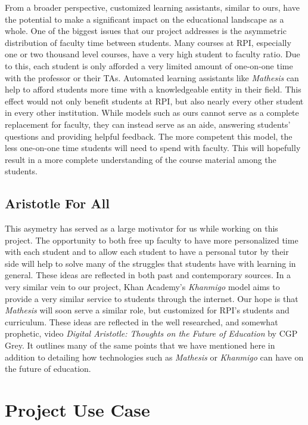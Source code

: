 \documentclass[12pt,a4paper]{article}
\begin{document}
    From a broader perspective, customized learning assistants, similar to ours, have the potential
    to make a significant impact on the educational landscape as a whole.  One of the biggest issues
    that our project addresses is the asymmetric distribution of faculty time between students.
    Many courses at RPI, especially one or two thousand level courses, have a very high student to
    faculty ratio.  Due to this, each student is only afforded a very limited amount of one-on-one
    time with the professor or their TAs.  Automated learning assistants like \textit{Mathesis} can
    help to afford students more time with a knowledgeable entity in their field.  This effect would
    not only benefit students at RPI, but also nearly every other student in every other institution.
    While models such as ours cannot serve as a complete replacement for faculty, they can instead
    serve as an aide, answering students' questions and providing helpful feedback.  The more
    competent this model, the less one-on-one time students will need to spend with faculty.  This
    will hopefully result in a more complete understanding of the course material among the students.

    \subsection{Aristotle For All}

    This asymetry has served as a large motivator for us while working on this project.  The opportunity to
    both free up faculty to have more personalized time with each student and to allow each student
    to have a personal tutor by their side will help to solve many of the struggles that students
    have with learning in general.  These ideas are reflected in both past and contemporary sources.
    In a very similar vein to our project, Khan Academy's \textit{Khanmigo}\cite{khanmigo} model
    aims to provide a very similar service to students through the internet.  Our hope is that
    \textit{Mathesis} will soon serve a similar role, but customized for RPI's students and
    curriculum.  These ideas are reflected in the well researched, and somewhat prophetic, video
    \textit{Digital Aristotle: Thoughts on the Future of Education} by CGP Grey.  It outlines
    many of the same points that we have mentioned here in addition to detailing how technologies
    such as \textit{Mathesis} or \textit{Khanmigo} can have on the future of education.

    \section{Project Use Case}
\end{document}
